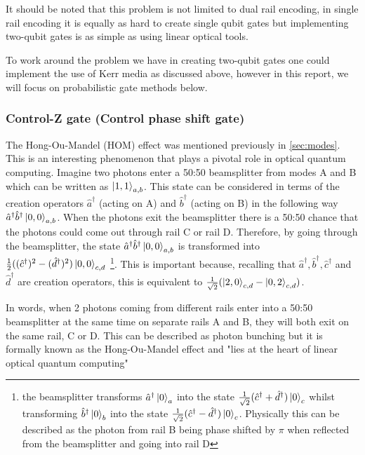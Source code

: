 It should be noted that this problem is not limited to dual rail encoding, in single rail encoding it is equally as hard to create single qubit gates but implementing two-qubit gates is as simple as using linear optical tools.

To work around the problem we have in creating two-qubit gates one could implement the use of Kerr media as discussed above, however in this report, we will focus on probabilistic gate methods below.


\subsubsection{Control-Z gate (Control phase shift gate)}
The Hong-Ou-Mandel (HOM) \cite{PhysRevLett.59.2044} effect was mentioned previously in \cref{sec:modes}. This is an interesting phenomenon that plays a pivotal role in optical quantum computing. Imagine two photons enter a 50:50 beamsplitter from modes A and B which can be written as $\ket{1,1}_{a,b}$. This state can be considered in terms of the creation operators $\hat{a}^\dagger$ (acting on A) and $\hat{b}^\dagger$ (acting on B) in the following way $\hat{a}^\dagger\hat{b}^\dagger\ket{0,0}_{a,b}$. When the photons exit the beamsplitter there is a 50:50 chance that the photons could come out through rail C or rail D. Therefore, by going through the beamsplitter, the state $\hat{a}^\dagger\hat{b}^\dagger\ket{0,0}_{a,b}$ is transformed into $\frac{1}{2}((\hat{c}^\dagger)^2 - (\hat{d}^\dagger)^2)\ket{0,0}_{c,d}$ \footnote{ the beamsplitter transforms $\hat{a}^\dagger\ket{0}_a$ into the state $\frac{1}{\sqrt{2}}(\hat{c}^\dagger + \hat{d}^\dagger)\ket{0}_c$ whilst transforming  $\hat{b}^\dagger\ket{0}_b$ into the state $\frac{1}{\sqrt{2}}(\hat{c}^\dagger - \hat{d}^\dagger)\ket{0}_c$. Physically this can be described as the photon from rail B being phase shifted by $\pi$ when reflected from the beamsplitter and going into rail D}. This is important because, recalling that $\hat{a}^\dagger, \hat{b}^\dagger, \hat{c}^\dagger$ and $\hat{d}^\dagger$ are creation operators, this is equivalent to $\frac{1}{\sqrt{2}}(\ket{2,0}_{c,d} - \ket{0,2}_{c,d})$.

In words, when 2 photons coming from different rails enter into a 50:50 beamsplitter at the same time on separate rails A and B, they will both exit on the same rail, C or D. This can be described as photon bunching but it is formally known as the Hong-Ou-Mandel effect and "lies at the heart of linear optical quantum computing" \cite{Kok:2005jip}

